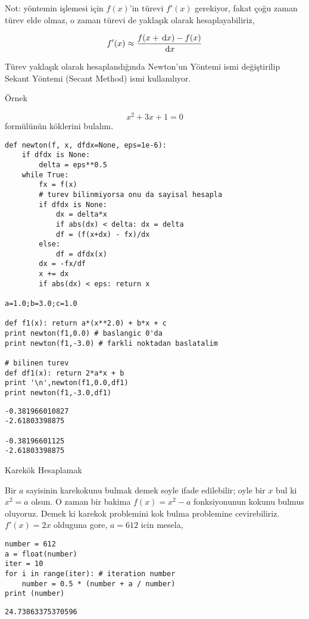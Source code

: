 \documentclass[12pt,fleqn]{article}\usepackage{../../common}
\begin{document}
Not: yöntemin işlemesi için $f(x)$'in türevi $f'(x)$ gerekiyor, fakat çoğu
zaman türev elde olmaz, o zaman türevi de yaklaşık olarak hesaplayabiliriz, 

$$ f'(x) \approx \frac{f(x + \,\mathrm{d} x) - f(x)}{\,\mathrm{d} x}$$

Türev yaklaşık olarak hesaplandığında Newton'un Yöntemi ismi değiştirilip
Sekant Yöntemi (Secant Method) ismi kullanılıyor.

Örnek

$$ x^2 + 3 x + 1 = 0$$ formülünün köklerini bulalım. 

\begin{verbatim}
def newton(f, x, dfdx=None, eps=1e-6):
    if dfdx is None: 
        delta = eps**0.5
    while True:
        fx = f(x)
        # turev bilinmiyorsa onu da sayisal hesapla
        if dfdx is None:
            dx = delta*x
            if abs(dx) < delta: dx = delta
            df = (f(x+dx) - fx)/dx
        else:
            df = dfdx(x)
        dx = -fx/df
        x += dx
        if abs(dx) < eps: return x

a=1.0;b=3.0;c=1.0

def f1(x): return a*(x**2.0) + b*x + c
print newton(f1,0.0) # baslangic 0'da
print newton(f1,-3.0) # farkli noktadan baslatalim

# bilinen turev 
def df1(x): return 2*a*x + b
print '\n',newton(f1,0.0,df1)
print newton(f1,-3.0,df1) 

\end{verbatim}

\begin{verbatim}
-0.381966010827
-2.61803398875

-0.38196601125
-2.61803398875
\end{verbatim}

Karekök Hesaplamak

Bir $a$ sayisinin karekokunu bulmak demek soyle ifade edilebilir; oyle bir $x$
bul ki $x^2 = a$ olsun. O zaman bir bakima $f(x) = x^2 - a$ fonksiyonunun kokunu
bulmus oluyoruz. Demek ki karekok problemini kok bulma problemine cevirebiliriz.
$f'(x) = 2x$ olduguna gore, $a = 612$ icin mesela,

\begin{verbatim}
number = 612
a = float(number)
iter = 10
for i in range(iter): # iteration number
    number = 0.5 * (number + a / number)
print (number)    
\end{verbatim}

\begin{verbatim}
24.73863375370596
\end{verbatim}
\end{document}
